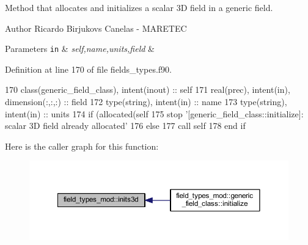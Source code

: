 Method that allocates and initializes a scalar 3D field in a generic field. 

\begin{DoxyAuthor}{Author}
Ricardo Birjukovs Canelas -\/ M\+A\+R\+E\+T\+EC 
\end{DoxyAuthor}

\begin{DoxyParams}[1]{Parameters}
\mbox{\tt in}  & {\em self,name,units,field} & \\
\hline
\end{DoxyParams}


Definition at line 170 of file fields\+\_\+types.\+f90.


\begin{DoxyCode}
170     \textcolor{keywordtype}{class}(generic\_field\_class), \textcolor{keywordtype}{intent(inout)} :: self
171     \textcolor{keywordtype}{real(prec)}, \textcolor{keywordtype}{intent(in)}, \textcolor{keywordtype}{dimension(:,:,:)} :: field
172     \textcolor{keywordtype}{type}(string), \textcolor{keywordtype}{intent(in)} :: name
173     \textcolor{keywordtype}{type}(string), \textcolor{keywordtype}{intent(in)} :: units
174     \textcolor{keywordflow}{if} (\textcolor{keyword}{allocated}(self%
175         stop \textcolor{stringliteral}{'[generic\_field\_class::initialize]: scalar 3D field already allocated'}
176     \textcolor{keywordflow}{else}
177         \textcolor{keyword}{call }self%
178 \textcolor{keywordflow}{    end if}
\end{DoxyCode}
Here is the caller graph for this function\+:
\nopagebreak
\begin{figure}[H]
\begin{center}
\leavevmode
\includegraphics[width=350pt]{namespacefield__types__mod_ac3c3c9514102272c69299be06deabbcd_icgraph}
\end{center}
\end{figure}
\mbox{\label{namespacefield__types__mod_a0499b29bbd4e4628fe73678cf554d918}} 
